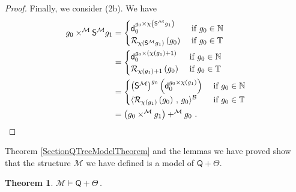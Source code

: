\documentclass[10pt,a4paper, openany,  oldfontcommands]{memoir}
\newtheorem{theorem}{Theorem}
\newtheorem{open problem} [theorem] {Open Problem}
\newtheorem{open question} [theorem] {Open Question}
\renewcommand{\mathrm}{\mathsf}
\begin{document}
\begin{proof}
Finally,  we consider (2b). 
We have 
\begin{align*}
 g_0  \times^{  \mathcal{M}  }    \mathrm{S}^{ \mathcal{M}  }  g_1    
 &  =  \begin{cases}
\mathsf{d}_0^{   g_0   \times  \chi \left(   \mathrm{S}^{ \mathcal{M}  } g_1  \right)  }         &   \mbox{  if  }    g_0   \in  \mathbb{N}
 \\
 \mathcal{R}_{ \chi \left(   \mathrm{S}^{ \mathcal{M}  } g_1  \right)   }  \left(  g_0   \right)      &  \mbox{  if  }   g_0   \in  \mathbb{T}
 \end{cases}
 \\
 &  =  \begin{cases}
\mathsf{d}_0^{   g_0   \times  \left(  \chi \left(  g_1  \right)  + 1  \right)   }         &   \mbox{  if  }    g_0   \in  \mathbb{N}
 \\
 \mathcal{R}_{ \chi \left(    g_1  \right)  +1  }  \left(  g_0   \right)      &  \mbox{  if  }   g_0   \in  \mathbb{T}
 \end{cases}
  \\
 &  =  \begin{cases}
 \left(   \mathrm{S}^{ \mathcal{M}  }  \right)^{ g_0 }   \left(  \mathsf{d}_0^{   g_0   \times    \chi \left(  g_1  \right)    }   \right)    
                 &   \mbox{  if  }    g_0   \in  \mathbb{N}
 \\
 \langle    \mathcal{R}_{ \chi \left(    g_1  \right)   }  \left(  g_0   \right)    \,  ,  \,  g_0   \rangle^{  \mathcal{B}  }
                     &  \mbox{  if  }   g_0   \in  \mathbb{T}
 \end{cases}
 \\
 & =   \left( g_0 \times^{  \mathcal{M}  }   g_1  \right)   +^{  \mathcal{M}  }    g_0 
 \     .    \qedhere
\end{align*}
\end{proof}





Theorem  \ref{SectionQTreeModelTheorem}  and  the lemmas we have proved show that the structure $  \mathcal{M} $ we have defined is a model of   $  \mathsf{Q} +  \Theta     $. 


\begin{theorem}
$  \mathcal{M}  \models   \mathsf{Q} +  \Theta    \,   $.
\end{theorem}
\end{document}
